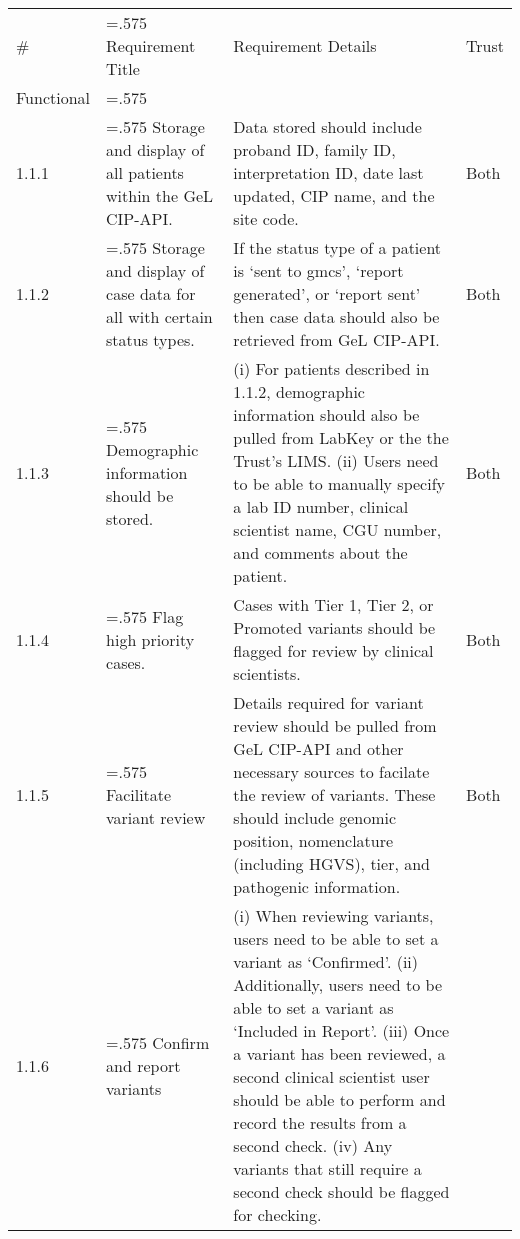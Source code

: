 \documentclass[a4paper, 10pt]{article}
\begin{document}
\renewcommand*{\arraystretch}{1.3}
\begin{table}[h]
    \centering
    \label{tab:urs}
    \begin{tabularx}{\textwidth}{@{}l>{\hsize=.575\hsize}X>{\hsize=1.425\hsize}Xl@{}}
        \rowcolor[HTML]{333333} 
        {\color[HTML]{FFFFFF} \#} & {\color[HTML]{FFFFFF} Requirement Title} & {\color[HTML]{FFFFFF} Requirement Details}                                                                                            & {\color[HTML]{FFFFFF} Trust} \\
        \rowcolor[HTML]{C0C0C0} 
        Functional
        &
        &
        &
        \\
        1.1.1
        & Storage and display of all patients within the GeL CIP-API.
        & Data stored should include proband ID, family ID, interpretation ID, date last updated, CIP name, and the site code.
        & Both
        \\
        1.1.2
        & Storage and display of case data for all with certain status types.
        & If the status type of a patient is `sent to gmcs', `report generated', or `report sent' then case data should also be retrieved from GeL CIP-API.
        & Both
        \\
        1.1.3
        & Demographic information should be stored.
        & (i) For patients described in 1.1.2, demographic information should also be pulled from LabKey or the the Trust's LIMS. (ii) Users need to be able to manually specify a lab ID number, clinical scientist name, CGU number, and comments about the patient.
        & Both
        \\
        1.1.4
        & Flag high priority cases.
        & Cases with Tier 1, Tier 2, or Promoted variants should be flagged for review by clinical scientists.
        & Both
        \\
        1.1.5
        & Facilitate variant review
        & Details required for variant review should be pulled from GeL CIP-API and other necessary sources to facilate the review of variants. These should include genomic position, nomenclature (including HGVS), tier, and pathogenic information.
        & Both
        \\
        1.1.6
        & Confirm and report variants 
        & (i) When reviewing variants, users need to be able to set a variant as `Confirmed'. (ii) Additionally, users need to be able to set a variant as `Included in Report'. (iii) Once a variant has been reviewed, a second clinical scientist user should be able to perform and record the results from a second check. (iv) Any variants that still require a second check should be flagged for checking.

\end{tabularx}
\end{table}
\end{document}
